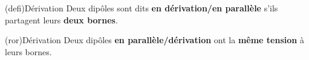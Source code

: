 \documentclass[../../main/main.tex]{subfiles}
\begin{document}
\begin{tcb}[sidebyside, righthand ratio=.4](defi){Dérivation}
	Deux dipôles sont dits \textbf{en dérivation/en parallèle} s'ils partagent
	leurs \textbf{deux bornes}.
	\tcblower
	\begin{center}
	\end{center}
\end{tcb}
\begin{tcb}[label=ror:serdiv, fontupper=\Large, cnt](ror){Dérivation}
	Deux dipôles \textbf{en parallèle/dérivation} ont la \textbf{même tension} à
	leurs bornes.
\end{tcb}
\end{document}
